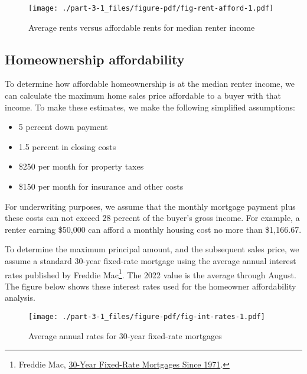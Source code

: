 \documentclass[
  letterpaper,
  DIV=11,
  numbers=noendperiod]{scrreprt}
\providecommand{\tightlist}{%
  \setlength{\itemsep}{0pt}\setlength{\parskip}{0pt}}\usepackage{longtable,booktabs,array}
\begin{document}
\begin{figure}

{\centering \texttt{[image: ./part-3-1\_files/figure-pdf/fig-rent-afford-1.pdf]}

}

\caption{\label{fig-rent-afford}Average rents versus affordable rents
for median renter income}

\end{figure}

\hypertarget{homeownership-affordability}{%
\subsection{Homeownership
affordability}\label{homeownership-affordability}}

To determine how affordable homeownership is at the median renter
income, we can calculate the maximum home sales price affordable to a
buyer with that income. To make these estimates, we make the following
simplified assumptions:

\begin{itemize}
\tightlist
\item
  5 percent down payment
\item
  1.5 percent in closing costs
\item
  \$250 per month for property taxes
\item
  \$150 per month for insurance and other costs
\end{itemize}

For underwriting purposes, we assume that the monthly mortgage payment
plus these costs can not exceed 28 percent of the buyer's gross income.
For example, a renter earning \$50,000 can afford a monthly housing cost
no more than \$1,166.67.

To determine the maximum principal amount, and the subsequent sales
price, we assume a standard 30-year fixed-rate mortgage using the
average annual interest rates published by Freddie Mac\footnote{Freddie
  Mac, \href{https://www.freddiemac.com/pmms/pmms30}{30-Year Fixed-Rate
  Mortgages Since 1971}.}. The 2022 value is the average through August.
The figure below shows these interest rates used for the homeowner
affordability analysis.

\begin{figure}

{\centering \texttt{[image: ./part-3-1\_files/figure-pdf/fig-int-rates-1.pdf]}

}

\caption{\label{fig-int-rates}Average annual rates for 30-year
fixed-rate mortgages}

\end{figure}
\end{document}
